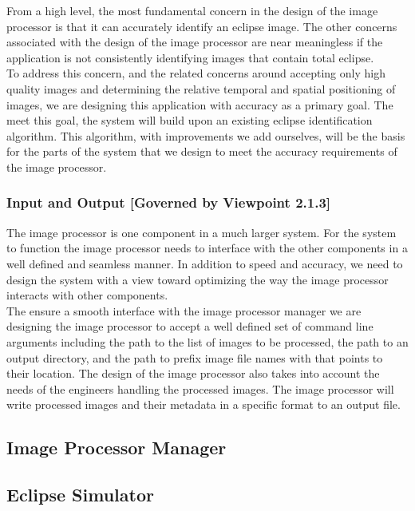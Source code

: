 \documentclass[10pt, onecolumn, draftclsnofoot, letterpaper, compsoc]{IEEEtran}
\begin{document}
From a high level, the most fundamental concern in the design of the image
processor is that it can accurately identify an eclipse image. The other
concerns associated with the design of the image processor are near meaningless
if the application is not consistently identifying images that contain total
eclipse.\\

To address this concern, and the related concerns around accepting only high
quality images and determining the relative temporal and spatial positioning of
images, we are designing this application with accuracy as a primary goal. The
meet this goal, the system will build upon an existing eclipse identification
algorithm. This algorithm, with improvements we add ourselves, will be the basis
for the parts of the system that we design to meet the accuracy requirements of
the image processor.\\

\subsubsection{Input and Output [Governed by Viewpoint 2.1.3]}

The image processor is one component in a much larger system. For the system to
function the image processor needs to interface with the other components in a
well defined and seamless manner. In addition to speed and accuracy, we need to
design the system with a view toward optimizing the way the image processor
interacts with other components.\\

The ensure a smooth interface with the image processor manager we are designing
the image processor to accept a well defined set of command line arguments
including the path to the list of images to be processed, the path to an output
directory, and the path to prefix image file names with that points to their
location. The design of the image processor also takes into account the needs of
the engineers handling the processed images. The image processor will write
processed images and their metadata in a specific format to an output file.\\

\subsection{Image Processor Manager}

\subsection{Eclipse Simulator}
\end{document}
